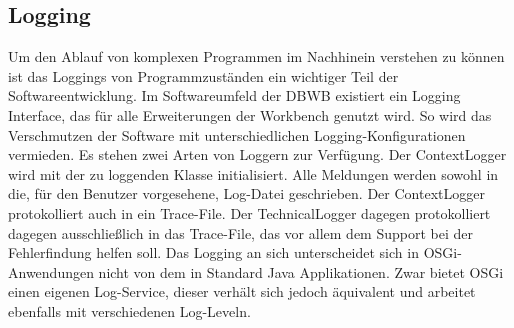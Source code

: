 {{{{\subsection{Logging}{
Um den Ablauf von komplexen Programmen im Nachhinein verstehen zu können ist das \glspl{Logging} von Programmzuständen ein wichtiger Teil der Softwareentwicklung. 
Im Softwareumfeld der \ac{DBWB} existiert ein Logging Interface, das für alle Erweiterungen der Workbench genutzt wird. So wird das Verschmutzen der Software mit unterschiedlichen Logging-Konfigurationen vermieden. Es stehen zwei Arten von Loggern zur Verfügung. Der ContextLogger wird mit der zu loggenden Klasse initialisiert. Alle Meldungen werden sowohl in die, für den Benutzer vorgesehene, Log-Datei geschrieben. Der ContextLogger protokolliert auch in ein Trace-File. Der TechnicalLogger dagegen protokolliert dagegen ausschließlich in das Trace-File, das vor allem dem Support bei der Fehlerfindung helfen soll. Das Logging an sich unterscheidet sich in \ac{OSGi}-Anwendungen nicht von dem in Standard Java Applikationen. Zwar bietet \ac{OSGi} einen eigenen Log-Service, dieser verhält sich jedoch äquivalent und arbeitet ebenfalls mit verschiedenen Log-Leveln. 

}



}}}}
